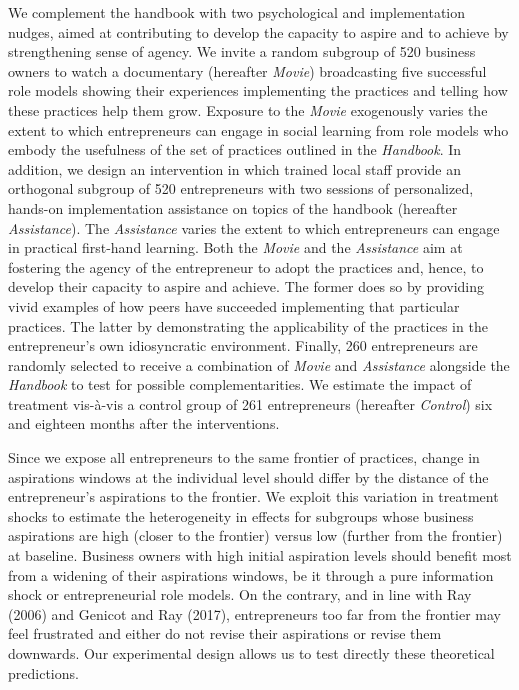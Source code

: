 \documentclass[11.5pt]{article}
\begin{document}
We complement the handbook with two psychological and implementation nudges, aimed at contributing to develop the capacity to aspire and to achieve by strengthening sense of agency. We invite a random subgroup of 520 business owners to watch a documentary  (hereafter \emph{Movie}) broadcasting five successful role models showing their experiences implementing the practices and telling how these practices help them grow. Exposure to the \emph{Movie} exogenously varies the extent to which entrepreneurs can engage in social learning from role models who embody the usefulness of the set of practices outlined in the \emph{Handbook}. In addition, we design an intervention in which trained local staff provide an orthogonal subgroup of 520 entrepreneurs with two sessions of personalized, hands-on implementation assistance on topics of the handbook (hereafter \emph{Assistance}). The \emph{Assistance} varies the extent to which entrepreneurs can engage in practical first-hand learning. Both the \emph{Movie} and the \emph{Assistance} aim at fostering the agency of the entrepreneur to adopt the practices and, hence, to develop their capacity to aspire and achieve. The former does so by providing vivid examples of how peers have succeeded implementing that particular practices. The latter by demonstrating the applicability of the practices in the entrepreneur's own idiosyncratic environment. Finally, 260 entrepreneurs are randomly selected to receive a combination of \emph{Movie} and \emph{Assistance} alongside the \emph{Handbook} to test for possible complementarities. We estimate the impact of treatment vis-\`{a}-vis a control group of 261 entrepreneurs (hereafter \emph{Control}) six and eighteen months after the interventions.

Since we expose all entrepreneurs to the same frontier of practices, change in aspirations windows at the individual level should differ by the distance of the entrepreneur's aspirations to the frontier. We exploit this variation in treatment shocks to estimate the heterogeneity in effects for subgroups whose business aspirations are high (closer to the frontier) versus low (further from the frontier) at baseline. Business owners with high initial aspiration levels should benefit most from a widening of their aspirations windows, be it through a pure information shock or entrepreneurial role models. On the contrary, and in line with Ray (2006) and Genicot and Ray (2017), entrepreneurs too far from the frontier may feel frustrated and either do not revise their aspirations or revise them downwards. Our experimental design allows us to test directly these theoretical predictions.
\end{document}
